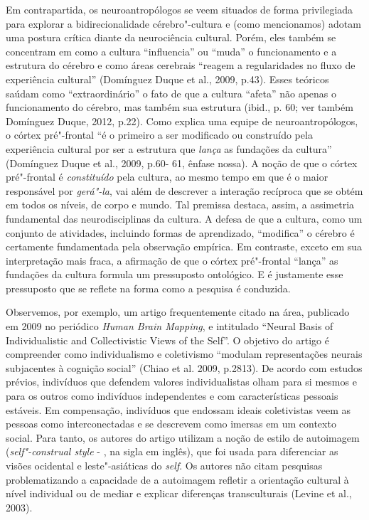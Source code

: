 Em contrapartida, os neuroantropólogos se veem situados de forma
privilegiada para explorar a bidirecionalidade cérebro"-cultura e (como
mencionamos) adotam uma postura crítica diante da neurociência cultural.
Porém, eles também se concentram em como a cultura ``influencia'' ou
``muda'' o funcionamento e a estrutura do cérebro e como áreas cerebrais
``reagem a regularidades no fluxo de experiência cultural'' (Domínguez
Duque et al., 2009, p.43). Esses teóricos saúdam como ``extraordinário''
o fato de que a cultura ``afeta'' não apenas o funcionamento do cérebro,
mas também sua estrutura (ibid., p. 60; ver também Domínguez Duque,
2012, p.22). Como explica uma equipe de neuroantropólogos, o córtex
pré"-frontal ``é o primeiro a ser modificado ou construído pela
experiência cultural por ser a estrutura que \emph{lança} as fundações
da cultura'' (Domínguez Duque et al., 2009, p.60- 61, ênfase nossa). A
noção de que o córtex pré"-frontal é \emph{constituído} pela cultura, ao
mesmo tempo em que é o maior responsável por \emph{gerá"-la}, vai além de
descrever a interação recíproca que se obtém em todos os níveis, de
corpo e mundo. Tal premissa destaca, assim, a assimetria fundamental das
neurodisciplinas da cultura. A defesa de que a cultura, como um conjunto
de atividades, incluindo formas de aprendizado, ``modifica'' o cérebro é
certamente fundamentada pela observação empírica. Em contraste, exceto
em sua interpretação mais fraca, a afirmação de que o córtex pré"-frontal
``lança'' as fundações da cultura formula um pressuposto ontológico. E é
justamente esse pressuposto que se reflete na forma como a pesquisa é
conduzida.

Observemos, por exemplo, um artigo frequentemente citado na área,
publicado em 2009 no periódico \emph{Human Brain Mapping}, e intitulado
``Neural Basis of Individualistic and Collectivistic Views of the
Self''. O objetivo do artigo é compreender como individualismo e
coletivismo ``modulam representações neurais subjacentes à cognição
social'' (Chiao et al. 2009, p.2813). De acordo com estudos prévios,
indivíduos que defendem valores individualistas olham para si mesmos e
para os outros como indivíduos independentes e com características
pessoais estáveis. Em compensação, indivíduos que endossam ideais
coletivistas veem as pessoas como interconectadas e se descrevem como
imersas em um contexto social. Para tanto, os autores do artigo utilizam
a noção de estilo de autoimagem (\emph{self"-construal style} - , na
sigla em inglês), que foi usada para diferenciar as visões ocidental e
leste"-asiáticas do \emph{self}. Os autores não citam pesquisas
problematizando a capacidade de a autoimagem refletir a orientação
cultural à nível individual ou de mediar e explicar diferenças
transculturais (Levine et al., 2003).

